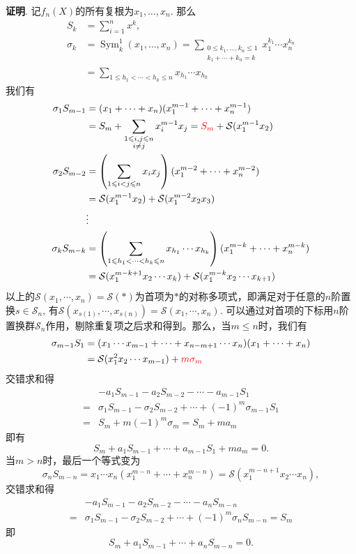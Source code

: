 {{\bf 证明}. 记$f_n(X)$的所有复根为$x_1,\ldots,x_n$. 那么
\begin{align*}
S_k & = \sum\limits_{i=1}^n x^k, \\
\sigma_k & = \operatorname{Sym}_k^1(x_1,\ldots,x_n) = \sum\limits_{\substack{0 \leqslant k_1,\ldots,k_n \leqslant 1 \\ k_1+\cdots+k_n=k}} x_1^{k_1} \cdots x_n^{k_n} \\
& = \sum\limits_{1 \leqslant h_1 < \cdots < h_k \leqslant n} x_{h_1} \cdots x_{h_k}
\end{align*}
我们有
\begin{align*}
\sigma_1 S_{m-1} & = (x_1 + \cdots + x_n) (x_1^{m-1} + \cdots + x_n^{m-1}) \\
& = S_m + \sum_{\substack{1 \leqslant i,j \leqslant n \\ i\neq j}} x_i^{m-1} x_j = {\color{red} S_m} + \mathcal{S}(x_1^{m-1}x_2) \\
\sigma_2 S_{m-2} & = \left( \sum_{1 \leqslant i < j \leqslant n } x_i x_j \right) (x_1^{m-2} + \cdots + x_n^{m-2}) \\
& = \mathcal{S}(x_1^{m-1}x_2) + \mathcal{S}(x_1^{m-2}x_2x_3) \\
& \vdots \\
\sigma_k S_{m-k} & = \left( \sum\limits_{1 \leqslant h_1 < \cdots < h_k \leqslant n} x_{h_1} \cdots x_{h_k} \right) (x_1^{m-k} + \cdots + x_n^{m-k}) \\
& = \mathcal{S}(x_1^{m-k+1}x_2\cdots x_k) + \mathcal{S}(x_1^{m-k}x_2\cdots x_{k+1})
\end{align*}
以上的$\mathcal{S}(x_1,\cdots,x_n) = \mathcal{S}(\ast)$为首项为$\ast$的对称多项式，即满足对于任意的$n$阶置换$s\in \mathcal{S}_n$, 有$\mathcal{S}(x_{s(1)},\cdots,x_{s(n)}) = \mathcal{S}(x_1,\cdots,x_n)$. 可以通过对首项的下标用$n$阶置换群$\mathcal{S}_n$作用，剔除重复项之后求和得到。那么，当$m\leqslant n$时，我们有
\begin{align*}
\sigma_{m-1} S_1 & = (x_1\cdots x_{m-1} + \cdots + x_{n-m+1}\cdots x_{n}) (x_1 + \cdots + x_{n}) \\
& = \mathcal{S}(x_1^2x_2\cdots x_{m-1}) + {\color{red} m\sigma_m}
\end{align*}
交错求和得
\begin{align*}
& -a_1 S_{m-1} - a_2 S_{m-2} - \cdots - a_{m-1} S_1 \\
= & \sigma_1 S_{m-1} - \sigma_2 S_{m-2} + \cdots + (-1)^{m} \sigma_{m-1} S_{1} \\
= & S_m + m(-1)^{m}\sigma_m = S_m + ma_m
\end{align*}
即有
$$S_m + a_1S_{m-1} + \cdots + a_{m-1}S_1 + ma_m = 0.$$
当$m > n$时，最后一个等式变为
$$\sigma_n S_{m-n} = x_1\cdots x_n (x_1^{m-n} + \cdots + x_n^{m-n}) = \mathcal{S}(x_1^{m-n+1}x_2 \cdots x_n),$$
交错求和得
\begin{align*}
& -a_1 S_{m-1} - a_2 S_{m-2} - \cdots - a_n S_{m-n} \\
= & \sigma_1 S_{m-1} - \sigma_2 S_{m-2} + \cdots + (-1)^{m} \sigma_n S_{m-n} = S_m
\end{align*}
即
$$S_m + a_1 S_{m-1} + \cdots + a_n S_{m-n} = 0.$$

}
